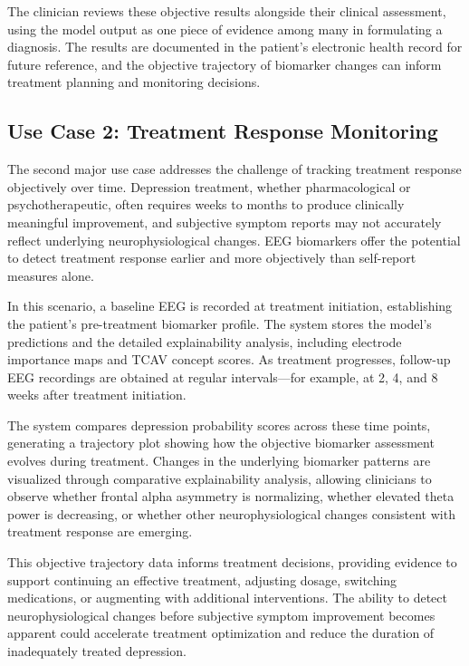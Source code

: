The clinician reviews these objective results alongside their clinical assessment, using the model output as one piece of evidence among many in formulating a diagnosis. The results are documented in the patient's electronic health record for future reference, and the objective trajectory of biomarker changes can inform treatment planning and monitoring decisions.

\subsection{Use Case 2: Treatment Response Monitoring}

The second major use case addresses the challenge of tracking treatment response objectively over time. Depression treatment, whether pharmacological or psychotherapeutic, often requires weeks to months to produce clinically meaningful improvement, and subjective symptom reports may not accurately reflect underlying neurophysiological changes. EEG biomarkers offer the potential to detect treatment response earlier and more objectively than self-report measures alone.

In this scenario, a baseline EEG is recorded at treatment initiation, establishing the patient's pre-treatment biomarker profile. The system stores the model's predictions and the detailed explainability analysis, including electrode importance maps and TCAV concept scores. As treatment progresses, follow-up EEG recordings are obtained at regular intervals---for example, at 2, 4, and 8 weeks after treatment initiation.

The system compares depression probability scores across these time points, generating a trajectory plot showing how the objective biomarker assessment evolves during treatment. Changes in the underlying biomarker patterns are visualized through comparative explainability analysis, allowing clinicians to observe whether frontal alpha asymmetry is normalizing, whether elevated theta power is decreasing, or whether other neurophysiological changes consistent with treatment response are emerging.

This objective trajectory data informs treatment decisions, providing evidence to support continuing an effective treatment, adjusting dosage, switching medications, or augmenting with additional interventions. The ability to detect neurophysiological changes before subjective symptom improvement becomes apparent could accelerate treatment optimization and reduce the duration of inadequately treated depression.

